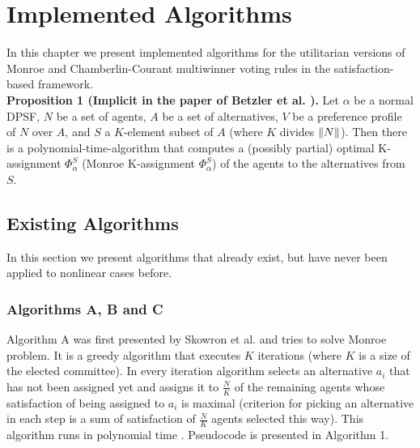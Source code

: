 \chapter{Implemented Algorithms}
\label{cha:implementedAlgorithms}

In this chapter we present implemented algorithms for the utilitarian versions of Monroe and Chamberlin-Courant multiwinner voting rules in the satisfaction-based framework.
\\

\noindent
\textbf{Proposition 1 (Implicit in the paper of Betzler et al. \cite{3}).} Let $\alpha$ be a normal DPSF, $N$ be a set of agents, $A$ be a set of alternatives, $V$ be a preference profile of $N$ over $A$, and $S$ a $K$-element subset of $A$ (where $K$ divides $\lVert N\rVert$). Then there is a polynomial-time-algorithm that computes a (possibly partial) optimal K-assignment $\Phi^{S}_{\alpha}$ (Monroe K-assignment $\Phi^{S}_{\alpha}$) of the agents to the alternatives from $S$.
\\

\section{Existing Algorithms}

In this section we present algorithms that already exist, but have never been applied to nonlinear cases before.

\subsection{Algorithms A, B and C}

Algorithm A was first presented by Skowron et al. \cite{1} and tries to solve Monroe problem. It is a greedy algorithm that executes $K$ iterations (where $K$ is a size of the elected committee). In every iteration algorithm selects an alternative $a_{i}$ that has not been assigned yet and assigns it to $\frac{N}{K}$ of the remaining agents whose satisfaction of being assigned to $a_{i}$ is maximal (criterion for picking an alternative in each step is a sum of satisfaction of $\frac{N}{K}$ agents selected this way). This algorithm runs in polynomial time \cite{1}. Pseudocode is presented in Algorithm 1.
\\

